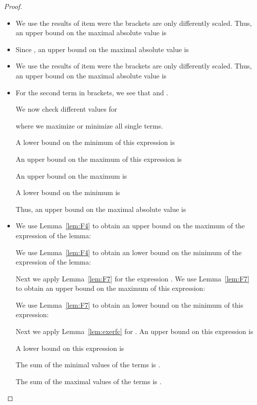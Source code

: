 \documentclass{article}
\begin{document}
\begin{proof}
\begin{itemize}
\item 

We use the results of  item 
were the brackets are only differently scaled.
Thus, an upper bound on the maximal absolute value is 


\item 

Since ,
an upper bound on the maximal absolute value is 


\item 

We use the results of  item 
were the brackets are only differently scaled.
Thus, an upper bound on the maximal absolute value is 


\item 

For the second term in brackets, we see that
 and .

We now check different values for 

where we maximize or minimize all single terms.


A lower bound on the minimum of this expression is

An upper bound on the maximum of this expression is



An upper bound on the maximum is

A lower bound on the minimum is

Thus, an upper bound on the maximal absolute value is 


\item 

We use Lemma~\ref{lem:F4} to obtain
an upper bound on the maximum of the expression of the lemma:

We use Lemma~\ref{lem:F4} to obtain
an lower bound on the minimum of the expression of the lemma:



Next we apply Lemma~\ref{lem:F7} for the expression .
We use Lemma~\ref{lem:F7} to obtain
an upper bound on the maximum of this expression:

We use Lemma~\ref{lem:F7} to obtain
an lower bound on the minimum of this expression:


Next we apply Lemma~\ref{lem:exerfc} for .
An upper bound on this expression is

A lower bound on this expression is


The sum of the minimal values of the terms is
.

The sum of the maximal values of the terms is
.



\end{itemize}
\end{proof}
\end{document}
